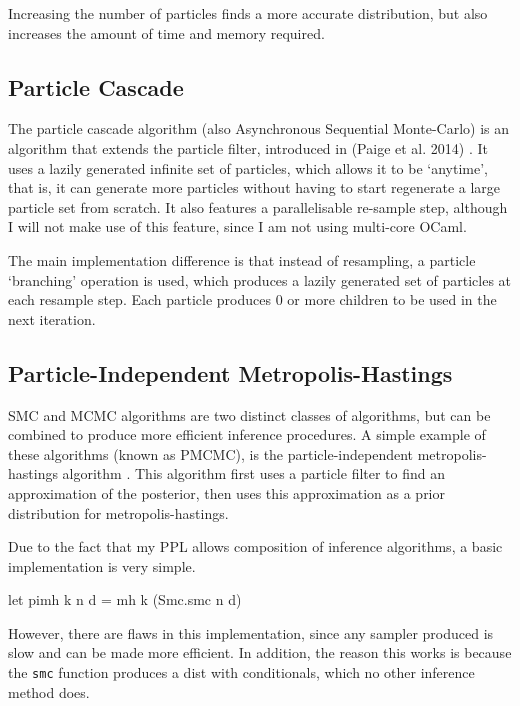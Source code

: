 Increasing the number of particles finds a more accurate distribution, but also increases the amount of time and memory required.
	
\subsection{Particle Cascade} \label{sec:pc}
The particle cascade algorithm (also Asynchronous Sequential Monte-Carlo) is an algorithm that extends the particle filter, introduced in (Paige et al. 2014) \cite{paige2014asynchronous}. It uses a lazily generated infinite set of particles, which allows it to be `anytime', that is, it can generate more particles without having to start regenerate a large particle set from scratch. It also features a parallelisable re-sample step, although I will not make use of this feature, since I am not using multi-core OCaml.
	
The main implementation difference is that instead of resampling, a particle `branching' operation is used, which produces a lazily generated set of particles at each resample step. Each particle produces 0 or more children to be used in the next iteration.
	
\subsection{Particle-Independent Metropolis-Hastings} \label{sec:pimh}
	
SMC and MCMC algorithms are two distinct classes of algorithms, but can be combined to produce more efficient inference procedures. A simple example of these algorithms (known as PMCMC), is the particle-independent metropolis-hastings algorithm \cite{pmcmc}. This algorithm first uses a particle filter to find an approximation of the posterior, then uses this approximation as a prior distribution for metropolis-hastings.
	
	
Due to the fact that my PPL allows composition of inference algorithms, a basic implementation is very simple.
	
	\begin{ocamlcode-in}
let pimh k n d = mh k (Smc.smc n d)
	\end{ocamlcode-in}
However, there are flaws in this implementation, since any sampler produced is slow and can be made more efficient.
In addition, the reason this works is because the \texttt{smc} function produces a dist with conditionals, which no other inference method does.
	

